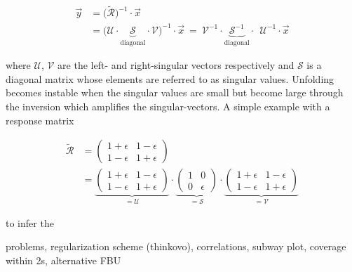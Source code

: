 \begin{align}
\vec{y}&=\Big(\widetilde{\mathcal{R}}\Big)^{-1}\cdot\vec{x}\\
&=\Big(\mathcal{U}\cdot\underbrace{\mathcal{S}}_\mathrm{diagonal}\cdot\mathcal{V}\Big)^{-1}\cdot\vec{x}~=~\mathcal{V}^{-1}\cdot\underbrace{\mathcal{S}^{-1}}_\mathrm{diagonal}\cdot~~\mathcal{U}^{-1}\cdot\vec{x}
\end{align}

where $\mathcal{U}$, $\mathcal{V}$ are the left- and right-singular vectors respectively and $\mathcal{S}$ is a diagonal matrix whose elements are referred to as singular values. Unfolding becomes instable when the singular values are small but become large through the inversion which amplifies the singular-vectors. A simple example with a response matrix 

\begin{align}
\widetilde{\mathcal{R}}&=\begin{pmatrix}
1+\epsilon & 1-\epsilon \\ 1-\epsilon & 1+\epsilon
\end{pmatrix}\\
&=\underbrace{\begin{pmatrix}
1+\epsilon & 1-\epsilon \\ 1-\epsilon & 1+\epsilon
\end{pmatrix}}_{=\mathcal{U}}\cdot\underbrace{\begin{pmatrix}
1 & 0 \\ 0 & \epsilon
\end{pmatrix}}_{=\mathcal{S}}\cdot\underbrace{\begin{pmatrix}
1+\epsilon & 1-\epsilon \\ 1-\epsilon & 1+\epsilon
\end{pmatrix}}_{=\mathcal{V}}
\end{align}

to infer the 

problems, regularization scheme (thinkovo), correlations, subway plot, coverage within 2s, alternative FBU
